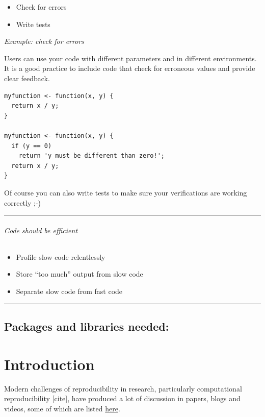 \documentclass[
]{book}
\providecommand{\tightlist}{%
  \setlength{\itemsep}{0pt}\setlength{\parskip}{0pt}}
\theoremstyle{definition}
\theoremstyle{definition}
\theoremstyle{definition}
\theoremstyle{definition}
\theoremstyle{remark}
\begin{document}
\begin{itemize}
\tightlist
\item
  Check for errors
\item
  Write tests
\end{itemize}

\emph{Example: check for errors}

Users can use your code with different parameters and in different environments. It is a good practice to include code that check for erroneous values and provide clear feedback.

\begin{verbatim}
myfunction <- function(x, y) {
  return x / y;
}

myfunction <- function(x, y) {
  if (y == 0) 
    return 'y must be different than zero!';
  return x / y; 
}
\end{verbatim}

Of course you can also write tests to make sure your verifications are working correctly ;-)

\begin{center}\rule{0.5\linewidth}{0.5pt}\end{center}

\hypertarget{code-should-be-efficient}{%
\subparagraph{Code should be efficient}\label{code-should-be-efficient}}

\begin{itemize}
\tightlist
\item
  Profile slow code relentlessly
\item
  Store ``too much'' output from slow code
\item
  Separate slow code from fast code
\end{itemize}

\begin{center}\rule{0.5\linewidth}{0.5pt}\end{center}

\hypertarget{packages-and-libraries-needed}{%
\section{Packages and libraries needed:}\label{packages-and-libraries-needed}}

\hypertarget{introduction}{%
\chapter{Introduction}\label{introduction}}

Modern challenges of reproducibility in research, particularly computational reproducibility {[}cite{]}, have produced a lot of discussion in papers, blogs and videos, some of which are listed \href{https://github.com/davan690/reproducible-guidebook/blob/main/sections/references/index.md}{here}.
\end{document}
